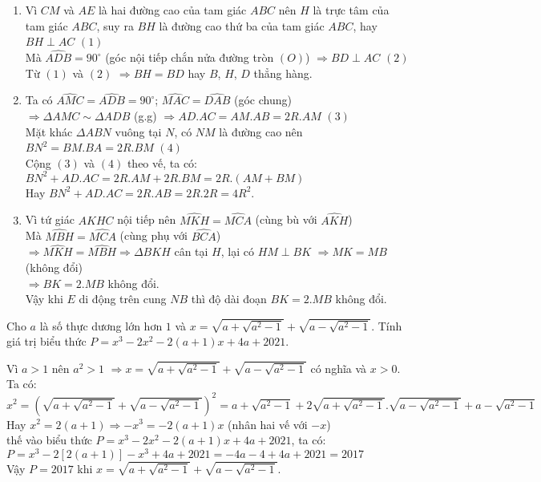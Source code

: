 \begin{ex}
{\begin{enumerate}
\begin{center}
\end{center}
\item Vì $CM$ và $AE$ là hai đường cao của tam giác $ABC$ nên $H$ là trực tâm của tam giác $ABC$, suy ra $BH$ là đường cao thứ ba của tam giác $ABC$, hay $BH \perp AC$ $(1)$\\
Mà $\widehat{ADB}=90^{\circ}$ (góc nội tiếp chắn nửa đường tròn $\left(O\right)$) $\Rightarrow BD \perp AC$ $(2)$\\
Từ $(1)$ và $(2)$ $\Rightarrow BH=BD$ hay $B$, $H$, $D$ thẳng hàng.
\item Ta có $\widehat{AMC}=\widehat{ADB}=90^{\circ}$; $\widehat{MAC}=\widehat{DAB}$ (góc chung)\\
$\Rightarrow \Delta AMC \sim \Delta ADB$ (g.g) $\Rightarrow AD.AC=AM.AB=2R.AM$ $(3)$\\
Mặt khác $\Delta ABN$ vuông tại $N$, có $NM$ là đường cao nên $BN^2=BM.BA=2R.BM$ $(4)$\\
Cộng $(3)$ và $(4)$ theo vế, ta có: $BN^2+AD.AC=2R.AM+2R.BM=2R.\left(AM+BM\right)$\\
Hay $BN^2+AD.AC=2R.AB=2R.2R=4R^2$.
\item Vì tứ giác $AKHC$ nội tiếp nên $\widehat{MKH}=\widehat{MCA}$ (cùng bù với $\widehat{AKH}$)\\
Mà $\widehat{MBH}=\widehat{MCA}$ (cùng phụ với $\widehat{BCA}$)\\
$\Rightarrow \widehat{MKH}=\widehat{MBH} \Rightarrow \Delta BKH$ cân tại $H$, lại có $HM \perp BK$ $\Rightarrow MK=MB$ (không đổi)\\
$\Rightarrow BK=2.MB$ không đổi.\\
Vậy khi $E$ di động trên cung $NB$ thì độ dài đoạn $BK=2.MB$ không đổi.
\end{enumerate}

	}
\end{ex}
\begin{ex}%
Cho $a$ là số thực dương lớn hơn $1$ và $x=\sqrt{a+\sqrt{a^2-1}}+\sqrt{a-\sqrt{a^2-1}}$. Tính giá trị biểu thức $P=x^3-2x^2-2\left(a+1\right)x+4a+2021$.

\loigiai
    {
Vì $a>1$ nên $a^2>1$ $\Rightarrow x=\sqrt{a+\sqrt{a^2-1}}+\sqrt{a-\sqrt{a^2-1}}$ có nghĩa và $x>0$.\\
Ta có:\\
 $x^2=\left(\sqrt{a+\sqrt{a^2-1}}+\sqrt{a-\sqrt{a^2-1}}\right)^2=a+\sqrt{a^2-1}+2\sqrt{a+\sqrt{a^2-1}}.\sqrt{a-\sqrt{a^2-1}}+a-\sqrt{a^2-1}$\\
Hay $x^2=2\left(a+1\right) \Rightarrow -x^3=-2\left(a+1\right)x$ (nhân hai vế với $-x$)\\
thế vào biểu thức $P=x^3-2x^2-2\left(a+1\right)x+4a+2021$, ta có:\\
$P=x^3-2\left[2\left(a+1\right)\right]-x^3+4a+2021=-4a-4+4a+2021=2017$\\
Vậy $P=2017$ khi $x=\sqrt{a+\sqrt{a^2-1}}+\sqrt{a-\sqrt{a^2-1}}$.
	}

\end{ex}

